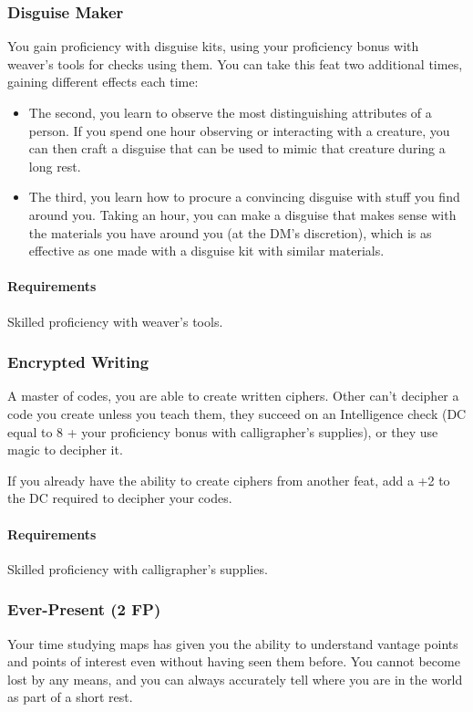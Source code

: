 \subsubsection{Disguise Maker} \label{feat::disguisemaker}
    You gain proficiency with disguise kits, using your proficiency bonus with weaver's tools for checks using them.
    You can take this feat two additional times, gaining different effects each time:
    \begin{itemize}
        \item The second, you learn to observe the most distinguishing attributes of a person.
        If you spend one hour observing or interacting with a creature, you can then craft a disguise that can be used to mimic that creature during a long rest.
        \item The third, you learn how to procure a convincing disguise with stuff you find around you.
        Taking an hour, you can make a disguise that makes sense with the materials you have around you (at the DM's discretion), which is as effective as one made with a disguise kit with similar materials.
    \end{itemize}
    \paragraph{Requirements} Skilled proficiency with weaver's tools.
\subsubsection{Encrypted Writing} \label{feat::encryptedwriting}
    A master of codes, you are able to create written ciphers.
    Other can't decipher a code you create unless you teach them, they succeed on an Intelligence check (DC equal to 8 + your proficiency bonus with calligrapher's supplies), or they use magic to decipher it.

    If you already have the ability to create ciphers from another feat, add a +2 to the DC required to decipher your codes.
    \paragraph{Requirements} Skilled proficiency with calligrapher's supplies.
\subsubsection{Ever-Present (2 FP)} \label{feat::everpresent}
    Your time studying maps has given you the ability to understand vantage points and points of interest even without having seen them before.
    You cannot become lost by any means, and you can always accurately tell where you are in the world as part of a short rest.
